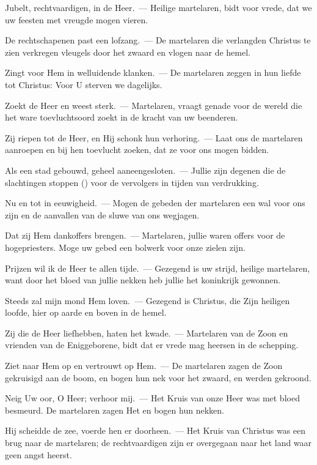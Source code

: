 \documentclass[12pt,twoside,a5paper]{article}
\begin{document}
\begin{halfparskip}

  Jubelt, rechtvaardigen, in de Heer.~--- Heilige martelaren, bidt voor vrede, dat we uw feesten met vreugde mogen vieren.

  De rechtschapenen past een lofzang.~--- De martelaren die verlangden Christus te zien verkregen vleugels door het zwaard en vlogen naar de hemel.

  Zingt voor Hem in welluidende klanken.~--- De martelaren zeggen in hun liefde tot Christus: Voor U sterven we dagelijks.

  Zoekt de Heer en weest sterk.~--- Martelaren, vraagt genade voor de wereld die het ware toevluchtsoord zoekt in de kracht van uw beenderen.

  Zij riepen tot de Heer, en Hij schonk hun verhoring.~--- Laat ons de martelaren aanroepen en bij hen toevlucht zoeken, dat ze voor ons mogen bidden.

  Als een stad gebouwd, geheel aaneengesloten.~--- Jullie zijn degenen die de slachtingen stoppen () voor de vervolgers in tijden van verdrukking.

  Nu en tot in eeuwigheid.~--- Mogen de gebeden der martelaren een wal voor ons zijn en de aanvallen van de sluwe van ons wegjagen.

  Dat zij Hem dankoffers brengen.~--- Martelaren, jullie waren offers voor de hogepriesters. Moge uw gebed een bolwerk voor onze zielen zijn.

  Prijzen wil ik de Heer te allen tijde.~--- Gezegend is uw strijd, heilige martelaren, want door het bloed van jullie nekken heb jullie het koninkrijk gewonnen.

  Steeds zal mijn mond Hem loven.~--- Gezegend is Christus, die Zijn heiligen loofde, hier op aarde en boven in de hemel.

  Zij die de Heer liefhebben, haten het kwade.~--- Martelaren van de Zoon en vrienden van de Eniggeborene, bidt dat er vrede mag heersen in de schepping.

  Ziet naar Hem op en vertrouwt op Hem.~--- De martelaren zagen de Zoon gekruisigd aan de boom, en bogen hun nek voor het zwaard, en werden gekroond.

  Neig Uw oor, O Heer; verhoor mij.~--- Het Kruis van onze Heer was met bloed besmeurd. De martelaren zagen Het en bogen hun nekken.

  Hij scheidde de zee, voerde hen er doorheen.~--- Het Kruis van Christus was een brug naar de martelaren; de rechtvaardigen zijn er overgegaan naar het land waar geen angst heerst.


\end{halfparskip}
\end{document}
